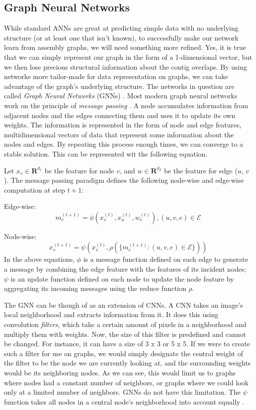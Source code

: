 \documentclass[times, utf8, diplomski, english]{fer_eng}
\begin{document}
\subsection{Graph Neural Networks}
\label{subsec:graph neural networks}

While standard ANNs are great at predicting simple data with no underlying structure (or at least one that isn't known), to successfully make our network learn from assembly graphs, we will need something more refined. Yes, it is true that we can simply represent our graph in the form of a 1-dimensional vector, but we then lose precious structural information about the contig overlaps. By using networks more tailor-made for data representation on graphs, we can take advantage of the graph's underlying structure. The networks in question are called \textit{Graph Neural Networks} (GNNs) \cite{GNN}. Most modern graph neural networks work on the principle of \textit{message passing} \cite{message_passing}. A node accumulates information from adjacent nodes and the edges connecting them and uses it to update its own weights. The information is represented in the form of node and edge features, multidimensional vectors of data that represent some information about the nodes and edges. By repeating this process enough times, we can converge to a stable solution. This can be represented wit the following equation.


Let $x_v \in \mathbf{R}^{d_1}$ be the feature for node $v$, and $w \in \mathbf{R}^{d_2}$ be the feature for edge ($u$, $v$). The message passing paradigm defines the following node-wise and edge-wise computation at step $t+1$:

Edge-wise: \[ m_e^{(t+1)} = \phi (x_v^{(t)}, x_u^{(t)}, w_e^{(t)}), (u, v, e) \in \mathcal{E} \]

Node-wise: \[ x_v^{(t+1)} = \psi (x_v^{(t)}, \rho (\{m_e^{(t+1)}: (u, v, e) \in \mathcal{E}\})) \]
In the above equations, $\phi$ is a message function defined on each edge to generate a message by combining the edge feature with the features of its incident nodes; $\psi$ is an update function defined on each node to update the node feature by aggregating its incoming messages using the reduce function $\rho$.

The GNN can be though of as an extension of CNNs. A CNN takes an image's local neighborhood and extracts information from it. It does this using convolution \textit{filters}, which take a certain amount of pixels in a neighborhood and multiply them with weights. Now, the size of this filter is predefined and cannot be changed. For instance, it can have a size of 3 x 3 or 5 x 5. If we were to create such a filter for use on graphs, we would simply designate the central weight of the filter to be the node we are currently looking at, and the surrounding weights would be its neighboring nodes. As we can see, this would limit us to graphs where nodes had a constant number of neighbors, or graphs where we could look only at a limited number of neighbors. GNNs do not have this limitation. The $\psi$ function takes all nodes in a central node's neighborhood into account equally \cite{GRL} \cite{bronstein2021geometric}.
\end{document}
